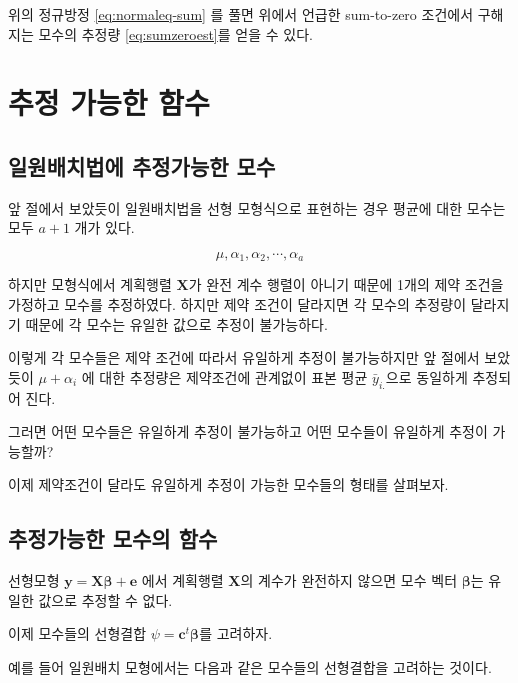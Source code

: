 \documentclass[
]{book}
\newcommand{\bm}[1]{\boldsymbol{\mathbf{#1}}}
\begin{document}
위의 정규방정 \eqref{eq:normaleq-sum} 를 풀면 위에서 언급한 sum-to-zero 조건에서 구해지는 모수의 추정량 \eqref{eq:sumzeroest}를 얻을 수 있다.

\hypertarget{estimable}{%
\chapter{추정 가능한 함수}\label{estimable}}

\hypertarget{uxc77cuxc6d0uxbc30uxce58uxbc95uxc5d0-uxcd94uxc815uxac00uxb2a5uxd55c-uxbaa8uxc218}{%
\section{일원배치법에 추정가능한 모수}\label{uxc77cuxc6d0uxbc30uxce58uxbc95uxc5d0-uxcd94uxc815uxac00uxb2a5uxd55c-uxbaa8uxc218}}

앞 절에서 보았듯이 일원배치법을 선형 모형식으로 표현하는 경우 평균에 대한 모수는 모두 \(a+1\) 개가 있다.

\[ \mu, \alpha_1, \alpha_2, \cdots, \alpha_a \]

하지만 모형식에서 계획행렬 \(\bm X\)가 완전 계수 행렬이 아니기 때문에 1개의 제약 조건을 가정하고 모수를 추정하였다.
하지만 제약 조건이 달라지면 각 모수의 추정량이 달라지기 때문에 각 모수는 유일한 값으로 추정이 불가능하다.

이렇게 각 모수들은 제약 조건에 따라서 유일하게 추정이 불가능하지만 앞 절에서 보았듯이 \(\mu + \alpha_i\) 에 대한 추정량은 제약조건에 관계없이
표본 평균 \(\bar y_{i.}\)으로 동일하게 추정되어 진다.

그러면 어떤 모수들은 유일하게 추정이 불가능하고 어떤 모수들이 유일하게 추정이 가능할까?

이제 제약조건이 달라도 유일하게 추정이 가능한 모수들의 형태를 살펴보자.

\hypertarget{uxcd94uxc815uxac00uxb2a5uxd55c-uxbaa8uxc218uxc758-uxd568uxc218}{%
\section{추정가능한 모수의 함수}\label{uxcd94uxc815uxac00uxb2a5uxd55c-uxbaa8uxc218uxc758-uxd568uxc218}}

선형모형 \(\bm y =\bm X \bm \beta + \bm e\) 에서 계획행렬 \(\bm X\)의 계수가 완전하지 않으면 모수 벡터 \(\bm \beta\)는 유일한 값으로 추정할 수 없다.

이제 모수들의 선형결합 \(\psi = \bm c^t \bm \beta\)를 고려하자.

예를 들어 일원배치 모형에서는 다음과 같은 모수들의 선형결합을 고려하는 것이다.
\end{document}
